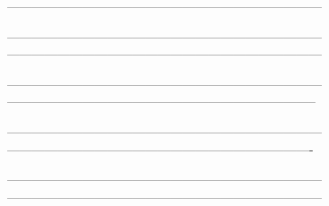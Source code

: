 \documentclass[11pt,a4paper,bibtotoc,idxtotoc,headsepline,footsepline,footexclude,DIV13,oneside]{scrbook}
\begin{document}
	\frontmatter
	
	
	
	
	
	
	
	
	\listoftodos
	\tableofcontents
   	

	\mainmatter
	
	
 ---------------------------------------------------------------------------
		
		
 ---------------------------------------------------------------------------
 ---------------------------------------------------------------------------
		
		
 ---------------------------------------------------------------------------
--------------------------------------------------------------------------
		
		
 ---------------------------------------------------------------------------
 -------------------------------------------------------------------------
		
		 ---------------------------------------------------------------------------
 ---------------------------------------------------------------------------
		
%		
		
		


  	\clearemptydoublepage
  
	
	
 
\end{document}

